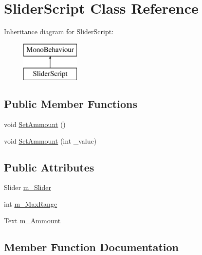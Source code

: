 \hypertarget{class_slider_script}{}\section{Slider\+Script Class Reference}
\label{class_slider_script}
Inheritance diagram for Slider\+Script\+:\begin{figure}[H]
\begin{center}
\leavevmode
\includegraphics[height=2.000000cm]{class_slider_script}
\end{center}
\end{figure}
\subsection*{Public Member Functions}
\begin{DoxyCompactItemize}
\item 
void \mbox{\hyperlink{class_slider_script_a4e60a149b20cb9c665d87e171b5d33b1}{Set\+Ammount}} ()
\item 
void \mbox{\hyperlink{class_slider_script_ae853030d4c38adbb92a4a914baf4e678}{Set\+Ammount}} (int \+\_\+value)
\end{DoxyCompactItemize}
\subsection*{Public Attributes}
\begin{DoxyCompactItemize}
\item 
Slider \mbox{\hyperlink{class_slider_script_ae8609f184b3c905fcb72cebfca2d4adc}{m\+\_\+\+Slider}}
\item 
int \mbox{\hyperlink{class_slider_script_ad8d4815c350c527a134607e9915b49d4}{m\+\_\+\+Max\+Range}}
\item 
Text \mbox{\hyperlink{class_slider_script_a92ee771d88249866ac21cb988b66b8b9}{m\+\_\+\+Ammount}}
\end{DoxyCompactItemize}


\subsection{Member Function Documentation}
\mbox{\label{class_slider_script_a4e60a149b20cb9c665d87e171b5d33b1}} 
